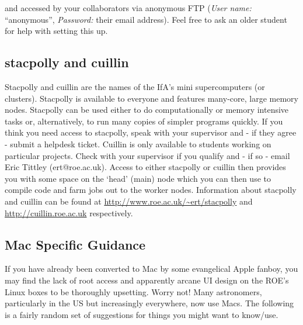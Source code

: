 and accessed by your collaborators via anonymous FTP (\textit{User name: } ``anonymous'', \textit{Password: } their email address). Feel free to ask an older student for help with setting this up.

%
%
\subsection{stacpolly and cuillin}

Stacpolly and cuillin are the names of the IfA's mini supercomputers (or clusters).  Stacpolly is available to everyone and features many-core, large memory nodes.  
Stacpolly can be used either to do computationally or memory intensive tasks or, alternatively, to run many copies of simpler programs quickly. If you think you need
access to stacpolly, speak with your supervisor and - if they agree - submit a helpdesk ticket. Cuillin is only available to students working on particular projects.
Check with your supervisor if you qualify and - if so - email Eric Tittley (ert@roe.ac.uk).  Access to either stacpolly or cuillin then provides you with some space 
on the `head' (main) node which you can then use to compile code and farm jobs out to the worker nodes. Information about stacpolly and cuillin can be found at 
\url{http://www.roe.ac.uk/~ert/stacpolly} and \url{http://cuillin.roe.ac.uk} respectively.

\subsection{Mac Specific Guidance}
\label{macusershelp}
If you have already been converted to Mac by some evangelical Apple fanboy, you may find the lack of root access and apparently arcane UI design on the ROE's Linux boxes to be thoroughly upsetting.
Worry not! 
Many astronomers, particularly in the US but increasingly everywhere, now use Macs.
The following is a fairly random set of suggestions for things you might want to know/use.


